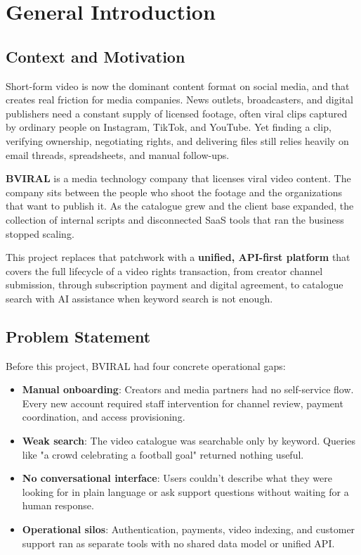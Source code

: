 \chapter*{General Introduction}

\section*{Context and Motivation}

Short-form video is now the dominant content format on social media, and that creates real friction for media companies. News outlets, broadcasters, and digital publishers need a constant supply of licensed footage, often viral clips captured by ordinary people on Instagram, TikTok, and YouTube. Yet finding a clip, verifying ownership, negotiating rights, and delivering files still relies heavily on email threads, spreadsheets, and manual follow-ups.

\textbf{BVIRAL} is a media technology company that licenses viral video content. The company sits between the people who shoot the footage and the organizations that want to publish it. As the catalogue grew and the client base expanded, the collection of internal scripts and disconnected SaaS tools that ran the business stopped scaling.

This project replaces that patchwork with a \textbf{unified, API-first platform} that covers the full lifecycle of a video rights transaction, from creator channel submission, through subscription payment and digital agreement, to catalogue search with AI assistance when keyword search is not enough.

\section*{Problem Statement}

Before this project, BVIRAL had four concrete operational gaps:

\begin{itemize}
  \item \textbf{Manual onboarding}: Creators and media partners had no self-service flow. Every new account required staff intervention for channel review, payment coordination, and access provisioning.
  \item \textbf{Weak search}: The video catalogue was searchable only by keyword. Queries like "a crowd celebrating a football goal" returned nothing useful.
  \item \textbf{No conversational interface}: Users couldn't describe what they were looking for in plain language or ask support questions without waiting for a human response.
  \item \textbf{Operational silos}: Authentication, payments, video indexing, and customer support ran as separate tools with no shared data model or unified API.
\end{itemize}

